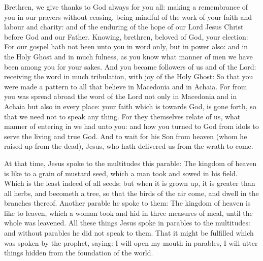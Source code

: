 



Brethren, we give thanks to God always for you all: making a
remembrance of you in our prayers without ceasing, being mindful of the work of
your faith and labour and charity: and of the enduring of the hope of our Lord
Jesus Christ before God and our Father.  Knowing, brethren, beloved of God,
your election: For our gospel hath not been unto you in word only, but in power
also: and in the Holy Ghost and in much fulness, as you know what manner of men
we have been among you for your sakes.  And you became followers of us and of
the Lord: receiving the word in much tribulation, with joy of the Holy Ghost:
So that you were made a pattern to all that believe in Macedonia and in Achaia.
For from you was spread abroad the word of the Lord not only in Macedonia and
in Achaia but also in every place: your faith which is towards God, is gone
forth, so that we need not to speak any thing.  For they themselves relate of
us, what manner of entering in we had unto you: and how you turned to God from
idols to serve the living and true God.  And to wait for his Son from heaven
(whom he raised up from the dead), Jesus, who hath delivered us from the wrath
to come.



At that time, Jesus spoke to the multitudes this parable: %
The kingdom of heaven is like to
a grain of mustard seed, which a man took and sowed in his field.  Which is the
least indeed of all seeds; but when it is grown up, it is greater than all
herbs, and becometh a tree, so that the birds of the air come, and dwell in the
branches thereof.  Another parable he spoke to them: The kingdom of heaven is
like to leaven, which a woman took and hid in three measures of meal, until the
whole was leavened.  All these things Jesus spoke in parables to the
multitudes: and without parables he did not speak to them.  That it might be
fulfilled which was spoken by the prophet, saying: I will open my mouth in
parables, I will utter things hidden from the foundation of the world.




